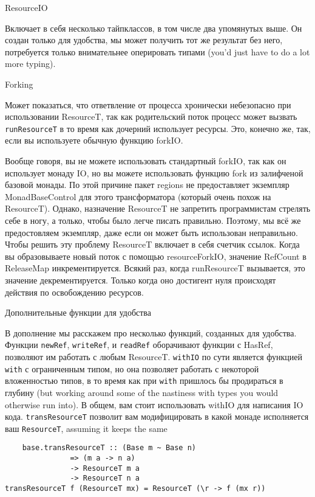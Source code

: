 ResourceIO

Включает в себя несколько тайпклассов, в том числе два
упомянутых выше. Он создан только для удобства, мы может получить тот же результат без
него, потребуется только внимательнее оперировать типами (you'd just have to do a lot
more typing).
   
Forking

Может показаться, что ответвление от процесса хронически небезопасно при использовании 
ResourceT, так как родительский поток процесс может вызвать \verb=runResourceT= в то время
как дочерний использует ресурсы. Это, конечно же, так, если вы используете обычную
функцию forkIO.

Вообще говоря, вы не можете использовать стандартный forkIO, так как он использует монаду
IO, но вы можете использовать функцию fork из залифченой базовой монады.
По этой причине пакет regions не предоставляет экземпляр MonadBaseControl для этого
трансформатора (который очень похож на ResourceT). Однако, назначение ResourceT
не запретить программистам стрелять себе в ногу, а только, чтобы было легче писать
правильно. Поэтому, мы всё же предостовляем экземпляр, даже если он может быть
использован неправильно. Чтобы решить эту проблему ResourceT включает в себя
счетчик ссылок. Когда вы образовываете новый поток с помощью resourceForkIO,
значение RefCount в ReleaseMap инкрементируется. Всякий раз, когда runResourceT
вызывается, это значение декрементируется. Только когда оно достигент нуля происходят
действия по освобождению ресурсов.
 
Дополнительные функции для удобства

В дополнение мы расскажем про несколько функций, созданных для удобства.
%   
Функции \verb=newRef=, \verb=writeRef=, и \verb=readRef= оборачивают
функции с HasRef, позволяют им работать с любым ResourceT.
\verb=withIO= по сути является функцией \verb=with= с ограниченным типом, но она 
позволяет работать с некоторой вложенностью типов, в то время как при \verb=with=
пришлось бы продираться в глубину (but working around 
some of the nastiness with types you would otherwise run into). В общем, вам стоит
использовать withIO для написания IO кода.
\verb=transResourceT= позволит вам модифицировать в какой монаде исполняется ваш
\verb=ResourceT=, assuming it keeps the same
\begin{lstlisting}
    base.transResourceT :: (Base m ~ Base n)
               => (m a -> n a)
               -> ResourceT m a
               -> ResourceT n a
transResourceT f (ResourceT mx) = ResourceT (\r -> f (mx r))
\end{lstlisting}  

